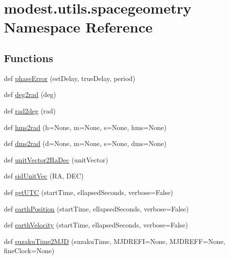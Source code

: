 \hypertarget{namespacemodest_1_1utils_1_1spacegeometry}{}\section{modest.\+utils.\+spacegeometry Namespace Reference}
\label{namespacemodest_1_1utils_1_1spacegeometry}
\subsection*{Functions}
\begin{DoxyCompactItemize}
\item 
def \hyperlink{namespacemodest_1_1utils_1_1spacegeometry_a69a1ef3c8a59eb0f83b4547549d4a7f5}{phase\+Error} (est\+Delay, true\+Delay, period)
\item 
def \hyperlink{namespacemodest_1_1utils_1_1spacegeometry_ae918dae28f5734ddaccd2637945ad776}{deg2rad} (deg)
\item 
def \hyperlink{namespacemodest_1_1utils_1_1spacegeometry_a93e1720efcf2b495c628f0bbf244701d}{rad2deg} (rad)
\item 
def \hyperlink{namespacemodest_1_1utils_1_1spacegeometry_a61474efffb07bef68eeb498ac92b294e}{hms2rad} (h=None, m=None, s=None, hms=None)
\item 
def \hyperlink{namespacemodest_1_1utils_1_1spacegeometry_a398ce622bd40db3b2665c3df13056ed5}{dms2rad} (d=None, m=None, s=None, dms=None)
\item 
def \hyperlink{namespacemodest_1_1utils_1_1spacegeometry_a7b471a80f3324b55d73cdda38adb99fb}{unit\+Vector2\+Ra\+Dec} (unit\+Vector)
\item 
def \hyperlink{namespacemodest_1_1utils_1_1spacegeometry_a9a295ccec50b2a38d2a5ef16d3e34244}{sid\+Unit\+Vec} (RA, D\+EC)
\item 
def \hyperlink{namespacemodest_1_1utils_1_1spacegeometry_a8db26869aaa5b35b8c8f7fd934f49ed5}{get\+U\+TC} (start\+Time, ellapsed\+Seconds, verbose=False)
\item 
def \hyperlink{namespacemodest_1_1utils_1_1spacegeometry_a1484fe47eb291c0df85ccfefb26ac670}{earth\+Position} (start\+Time, ellapsed\+Seconds, verbose=False)
\item 
def \hyperlink{namespacemodest_1_1utils_1_1spacegeometry_a83a4fcc4870f205e081b127cb452e05d}{earth\+Velocity} (start\+Time, ellapsed\+Seconds, verbose=False)
\item 
def \hyperlink{namespacemodest_1_1utils_1_1spacegeometry_a6202bbff79aa3ed41104bb6c3786d3cd}{suzaku\+Time2\+M\+JD} (suzaku\+Time, M\+J\+D\+R\+E\+FI=None, M\+J\+D\+R\+E\+FF=None, fine\+Clock=None)

\end{DoxyCompactItemize}
